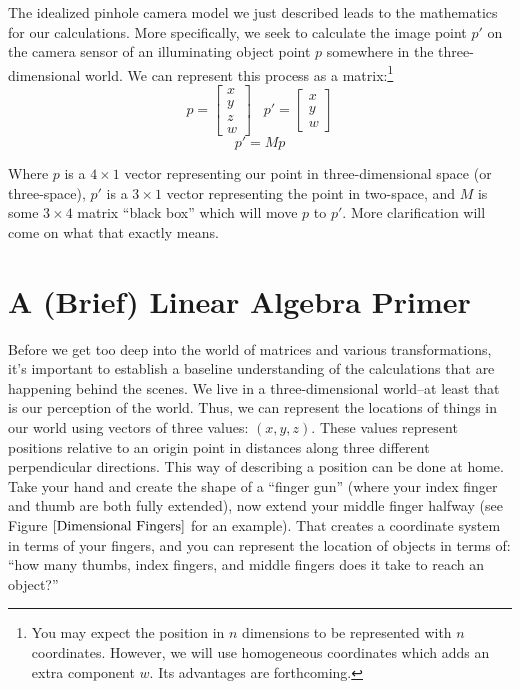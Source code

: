 \documentclass[
    12pt,
    twoside,
    bibstyle=chicago,
    headerstyle=uppercase,
	bibfile=biblatex_updating.bib
]{reedthesis}
\begin{document}
The idealized pinhole camera model we just described leads to the mathematics for our calculations. More specifically, we seek to calculate the image point $p'$ on the camera sensor of an illuminating object point $p$ somewhere in the three-dimensional world. We can represent this process as a matrix:\footnote{You may expect the position in $n$ dimensions to be represented with $n$ coordinates. However, we will use homogeneous coordinates which adds an extra component $w$. Its advantages are forthcoming.}
\[p = \left[\begin{smallmatrix}
	x\\y\\z\\w
\end{smallmatrix}\right] \;\;\; p' = \left[\begin{smallmatrix}
	x\\y\\w
\end{smallmatrix}\right]\]
\[p' = Mp\]

Where $p$ is a $4\times1$ vector representing our point in three-dimensional space (or three-space), $p'$ is a $3\times1$ vector representing the point in two-space, and $M$ is some $3\times4$ matrix ``black box'' which will move $p$ to $p'$. More clarification will come on what that exactly means.

\section{A (Brief) Linear Algebra Primer}
Before we get too deep into the world of matrices and various transformations, it's important to establish a baseline understanding of the calculations that are happening behind the scenes. We live in a three-dimensional world--at least that is our perception of the world. Thus, we can represent the locations of things in our world using vectors of three values: $(x, y, z)$. These values represent positions relative to an origin point in distances along three different perpendicular directions. This way of describing a position can be done at home. Take your hand and create the shape of a “finger gun” (where your index finger and thumb are both fully extended), now extend your middle finger halfway (see Figure $\ref{Dimensional Fingers}$ for an example). That creates a coordinate system in terms of your fingers, and you can represent the location of objects in terms of: ``how many thumbs, index fingers, and middle fingers does it take to reach an object?'' 
\end{document}
